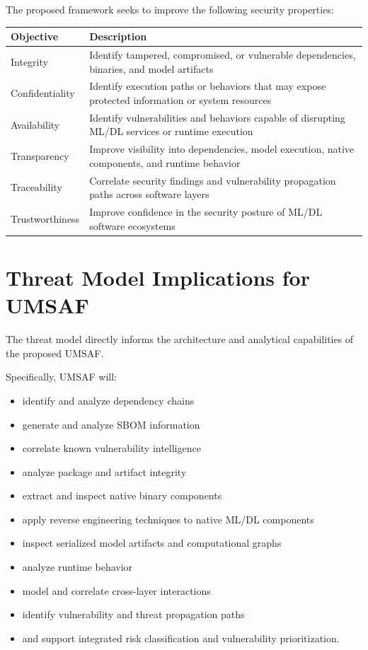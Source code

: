 \documentclass[
  12pt,
  letterpaper,
  oneside]{report}
\newcounter{none} %
\providecommand{\tightlist}{%
  \setlength{\itemsep}{0pt}\setlength{\parskip}{0pt}}
\begin{document}
The proposed framework seeks to improve the following security
properties:

{\def\LTcaptype{none} %
\begin{longtable}[]{@{}>{\raggedright\arraybackslash}p{}>{\raggedright\arraybackslash}p{}@{}}
\toprule\noalign{}
\textbf{Objective} & \textbf{Description} \\
\midrule\noalign{}
\endhead
\bottomrule\noalign{}
\endlastfoot
Integrity & Identify tampered, compromised, or vulnerable dependencies,
binaries, and model artifacts \\
\midrule
Confidentiality & Identify execution paths or behaviors that may expose
protected information or system resources \\
\midrule
Availability & Identify vulnerabilities and behaviors capable of
disrupting ML/DL services or runtime execution \\
\midrule
Transparency & Improve visibility into dependencies, model execution,
native components, and runtime behavior \\
\midrule
Traceability & Correlate security findings and vulnerability propagation
paths across software layers \\
\midrule
Trustworthiness & Improve confidence in the security posture of ML/DL
software ecosystems \\
\end{longtable}
}

\section{Threat Model Implications for UMSAF}\label{69-threat-model-implications-for-umsaf}

The threat model directly informs the architecture and analytical
capabilities of the proposed UMSAF.

Specifically, UMSAF will:

\begin{itemize}
\tightlist
\item
  identify and analyze dependency chains
\item
  generate and analyze SBOM information
\item
  correlate known vulnerability intelligence
\item
  analyze package and artifact integrity
\item
  extract and inspect native binary components
\item
  apply reverse engineering techniques to native ML/DL components
\item
  inspect serialized model artifacts and computational graphs
\item
  analyze runtime behavior
\item
  model and correlate cross-layer interactions
\item
  identify vulnerability and threat propagation paths
\item
  and support integrated risk classification and vulnerability
  prioritization.
\end{itemize}
\end{document}

